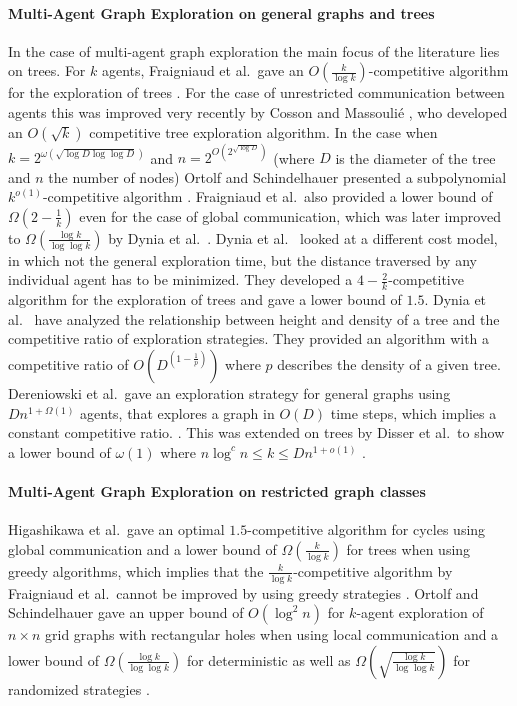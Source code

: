 \paragraph*{Multi-Agent Graph Exploration on general graphs and trees} In the case of multi-agent graph exploration the main focus of the literature lies on trees. For $k$ agents, Fraigniaud et al.\ gave an $O(\frac{k}{\log k})$-competitive algorithm
for the exploration of trees \cite{Fraigniaud2006}. For the case of unrestricted communication between agents this was improved very recently by Cosson and Massouli{\'e} \cite{DBLP:conf/innovations/CossonM24}, who developed an $O(\sqrt{k})$ competitive tree exploration algorithm.
In the case when $k = 2^{\omega(\sqrt{\log D \log \log D})}$ and $n = 2^{O(2^{\sqrt{\log D}})}$ (where $D$ is the diameter of the tree and $n$ the number of nodes) Ortolf and Schindelhauer presented a subpolynomial $k^{o(1)}$-competitive
algorithm \cite{Ortolf2014}.
Fraigniaud et al.\ also provided a lower bound of $\Omega(2-\frac{1}{k})$ even for the case of global communication, which was later improved to $\Omega(\frac{\log k}{\log \log k})$ by Dynia et al.\ 
\cite{Dynia}. Dynia et al.\ \cite{Dynia2006} looked at a different cost model, in which not the general exploration time, but the distance traversed by any
individual agent has to be minimized. They developed a $4-\frac{2}{k}$-competitive algorithm for the exploration of trees 
 and gave a lower bound of $1.5$. Dynia et al.\ \cite{Dynia2006a} have analyzed the relationship between height and density of a tree and the competitive 
ratio of exploration strategies. They provided an algorithm with a competitive ratio of $O(D^{(1-\frac{1}{p})})$ where $p$ describes the density of a given tree. Dereniowski et al.\ gave an exploration strategy for general graphs using $Dn^{1+\Omega(1)}$ agents, that explores a graph in $O(D)$ time steps,
which implies a constant competitive ratio. \cite{Dereniowski2015}. This was extended on trees by Disser et al.\ to show a lower bound of $\omega(1)$ where $n \log^c n \leq k \leq Dn^{1+o(1)}$ \cite{Disser2020}.

\paragraph*{Multi-Agent Graph Exploration on restricted graph classes} Higashikawa et al.\ gave an optimal $1.5$-competitive algorithm for cycles using global communication and a lower bound of $\Omega(\frac{k}{\log k})$ for trees when using greedy algorithms, 
which implies that the $\frac{k}{\log k}$-competitive algorithm by Fraigniaud et al.\ cannot be improved by using greedy strategies \cite{Higashikawa2012}. 
Ortolf and Schindelhauer gave an upper bound of $O(\log^2 n)$ for $k$-agent exploration of $n \times n$ grid graphs with rectangular holes when using local communication
and a lower bound of $\Omega(\frac{\log k}{\log \log k})$ for deterministic as well as $\Omega(\sqrt{\frac{\log k}{\log \log k}})$ for randomized strategies \cite{Ortolf2012}.

